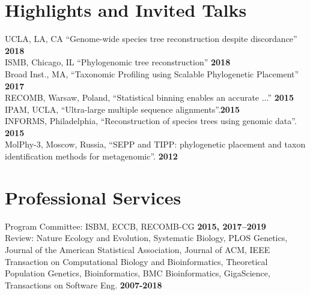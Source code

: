 \documentclass[margin,line,letterpaper]{resume}
\begin{document}
\begin{resume}
        \section{\mysidestyle Highlights and Invited Talks}
        UCLA, LA, CA ``Genome-wide species tree reconstruction despite discordance'' \hfill \textbf{2018}\\
        ISMB, Chicago, IL ``Phylogenomic tree reconstruction'' \hfill \textbf{2018}\\
        Broad Inst., MA, ``Taxonomic Profiling using Scalable Phylogenetic Placement'' \hfill \textbf{2017}\\
         RECOMB, Warsaw, Poland, ``Statistical binning enables an accurate ...''   \hfill \textbf{2015}\\
         IPAM, UCLA, ``Ultra-large multiple sequence alignments''.\hfill \textbf{2015}\\
         INFORMS, Philadelphia, ``Reconstruction of species trees using genomic data''.   \hfill \textbf{2015}\\
         MolPhy-3, Moscow, Russia, ``SEPP and TIPP: phylogenetic placement and taxon identification methods for metagenomic''. \hfill \textbf{2012}\vspace{1mm}
    \section{\mysidestyle Professional Services}
    Program Committee: ISBM, ECCB, RECOMB-CG  \hfill \textbf{2015, 2017--2019}\vspace{1mm}\\
    Review:  Nature Ecology and Evolution, Systematic Biology, PLOS Genetics, Journal of the American Statistical Association, Journal of ACM, IEEE Transaction on Computational Biology and Bioinformatics, Theoretical Population Genetics, Bioinformatics, BMC Bioinformatics, GigaScience,  Transactions on Software Eng.    \hfill \textbf{2007-2018}\vspace{1mm}

\end{resume}
\end{document}
